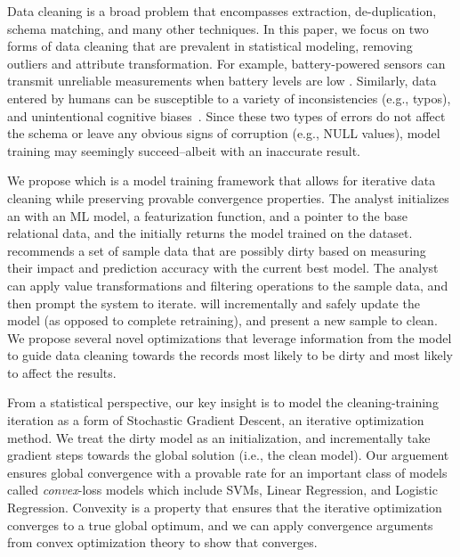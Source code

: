 Data cleaning is a broad problem that encompasses extraction, de-duplication, schema matching, and many other techniques.
In this paper, we focus on two forms of data cleaning that are prevalent in statistical modeling, removing outliers and attribute transformation.
For example, battery-powered sensors can transmit unreliable measurements when battery levels are low \cite{DBLP:conf/pervasive/JefferyAFHW06}. 
Similarly, data entered by humans can be susceptible to a variety of inconsistencies (e.g., typos), and unintentional cognitive biases~\cite{DBLP:conf/recsys/KrishnanPFG14}.
Since these two types of errors do not affect the schema or leave any obvious signs of corruption (e.g., NULL values), model training may seemingly succeed--albeit with an inaccurate result.

We propose \sys which is a model training framework that allows for iterative data cleaning while preserving provable convergence properties.
The analyst initializes an \sys with an ML model, a featurization function, and a pointer to the base relational data, and the \sys initially returns the model trained on the dataset.
\sys recommends a set of sample data that are possibly dirty based on measuring their impact and prediction accuracy with the current best model.
The analyst can apply value transformations and filtering operations to the sample data, and then prompt the system to iterate. 
\sys will incrementally and safely update the model (as opposed to complete retraining), and present a new sample to clean.
We propose several novel optimizations that leverage information from the model to guide data cleaning towards the records most likely to be dirty and most likely to affect the results.

From a statistical perspective, our key insight is to model the cleaning-training iteration as a form of Stochastic Gradient Descent, an iterative optimization method.
We treat the dirty model as an initialization, and incrementally take gradient steps towards the global solution (i.e., the clean model).
Our arguement ensures global convergence with a provable rate for an important class of models called \emph{convex}-loss models which include SVMs, Linear Regression, and Logistic Regression.
Convexity is a property that ensures that the iterative optimization converges to a true global optimum, and we can apply convergence arguments from convex optimization theory to show that \sys converges.

